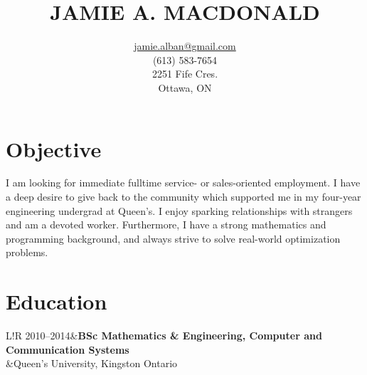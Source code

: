 \documentclass[10pt]{article}
\title{JAMIE A. MACDONALD}
\author{\href{mailto:jamie.alban@gmail.com}{jamie.alban@gmail.com}\\(613) 583-7654\\2251 Fife Cres.\\Ottawa, ON}
\date{}
\newcommand\VRule{\color{lightgray}\vrule width 0.5pt}
\begin{document}
\begin{minipage}{0.2\textwidth}
\hspace{0em}
\end{minipage}
\begin{minipage}{0.55\textwidth}
\vspace{-3em}
\maketitle
\end{minipage}
\begin{minipage}{0.25\textwidth}
\end{minipage}
\thispagestyle{fancy}
\vspace{-3em}
\section*{Objective}
I am looking for immediate fulltime service- or sales-oriented employment. I have a deep desire to give back to the community which supported me in my four-year engineering undergrad at Queen's. I enjoy sparking relationships with strangers and am a devoted worker. Furthermore, I have a strong mathematics and programming background, and always strive to solve real-world optimization problems.
\vspace{-1em}
\section*{Education}
\begin{tabular}{L!{\VRule}R}
2010--2014&{\bf BSc Mathematics \& Engineering, Computer and Communication Systems}\\
          &{Queen's University, Kingston Ontario}\\
\end{tabular}
\vspace{-1em}
\end{document}
